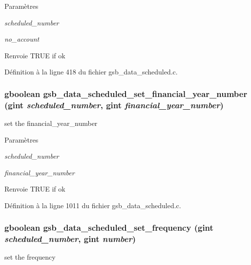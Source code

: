 \begin{DoxyParams}{Paramètres}
\item[{\em scheduled\_\-number}]\item[{\em no\_\-account}]\end{DoxyParams}
\begin{DoxyReturn}{Renvoie}
TRUE if ok 
\end{DoxyReturn}


Définition à la ligne 418 du fichier gsb\_\-data\_\-scheduled.c.

\subsubsection[{gsb\_\-data\_\-scheduled\_\-set\_\-financial\_\-year\_\-number}]{\setlength{\rightskip}{0pt plus 5cm}gboolean gsb\_\-data\_\-scheduled\_\-set\_\-financial\_\-year\_\-number (gint {\em scheduled\_\-number}, \/  gint {\em financial\_\-year\_\-number})}\label{gsb__data__scheduled_8h_ac692709b96f3876b8df8a081021e1bab}
set the financial\_\-year\_\-number


\begin{DoxyParams}{Paramètres}
\item[{\em scheduled\_\-number}]\item[{\em financial\_\-year\_\-number}]\end{DoxyParams}
\begin{DoxyReturn}{Renvoie}
TRUE if ok 
\end{DoxyReturn}


Définition à la ligne 1011 du fichier gsb\_\-data\_\-scheduled.c.

\subsubsection[{gsb\_\-data\_\-scheduled\_\-set\_\-frequency}]{\setlength{\rightskip}{0pt plus 5cm}gboolean gsb\_\-data\_\-scheduled\_\-set\_\-frequency (gint {\em scheduled\_\-number}, \/  gint {\em number})}\label{gsb__data__scheduled_8h_a3752ff74a4faa566975281e33ae6318b}
set the frequency


